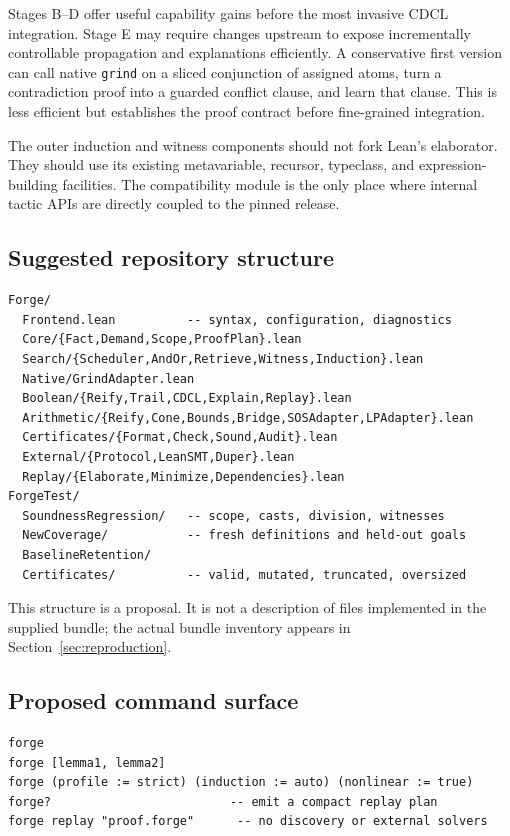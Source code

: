 \documentclass[11pt,letterpaper]{article}
\newcommand{\grind}{\texttt{grind}}
\theoremstyle{definition}\newtheorem{definition}[proposition]{Definition}
\begin{document}
Stages B--D offer useful capability gains before the most invasive CDCL integration. Stage E may require changes upstream to expose incrementally controllable propagation and explanations efficiently. A conservative first version can call native \grind{} on a sliced conjunction of assigned atoms, turn a contradiction proof into a guarded conflict clause, and learn that clause. This is less efficient but establishes the proof contract before fine-grained integration.

The outer induction and witness components should not fork Lean's elaborator. They should use its existing metavariable, recursor, typeclass, and expression-building facilities. The compatibility module is the only place where internal tactic APIs are directly coupled to the pinned release.

\subsection{Suggested repository structure}
\begin{lstlisting}
Forge/
  Frontend.lean          -- syntax, configuration, diagnostics
  Core/{Fact,Demand,Scope,ProofPlan}.lean
  Search/{Scheduler,AndOr,Retrieve,Witness,Induction}.lean
  Native/GrindAdapter.lean
  Boolean/{Reify,Trail,CDCL,Explain,Replay}.lean
  Arithmetic/{Reify,Cone,Bounds,Bridge,SOSAdapter,LPAdapter}.lean
  Certificates/{Format,Check,Sound,Audit}.lean
  External/{Protocol,LeanSMT,Duper}.lean
  Replay/{Elaborate,Minimize,Dependencies}.lean
ForgeTest/
  SoundnessRegression/   -- scope, casts, division, witnesses
  NewCoverage/           -- fresh definitions and held-out goals
  BaselineRetention/
  Certificates/          -- valid, mutated, truncated, oversized
\end{lstlisting}
This structure is a proposal. It is not a description of files implemented in the supplied bundle; the actual bundle inventory appears in Section~\ref{sec:reproduction}.

\subsection{Proposed command surface}
\begin{lstlisting}
forge
forge [lemma1, lemma2]
forge (profile := strict) (induction := auto) (nonlinear := true)
forge?                         -- emit a compact replay plan
forge replay "proof.forge"      -- no discovery or external solvers
\end{lstlisting}
\end{document}
